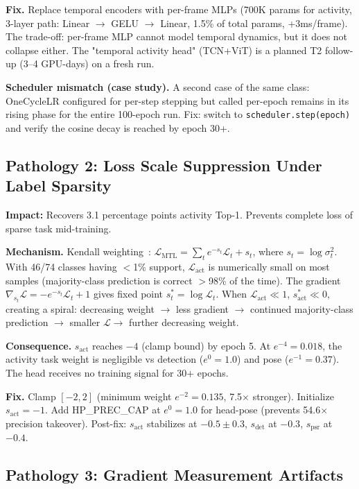 \documentclass[conference]{IEEEtran}
\begin{document}
\textbf{Fix.} Replace temporal encoders with per-frame MLPs (700K params for activity, 3-layer path: Linear $\to$ GELU $\to$ Linear, 1.5\% of total params, +3ms/frame). The trade-off: per-frame MLP cannot model temporal dynamics, but it does not collapse either. The "temporal activity head" (TCN+ViT) is a planned T2 follow-up (3--4 GPU-days) on a fresh run.

\textbf{Scheduler mismatch (case study).} A second case of the same class: OneCycleLR configured for per-step stepping but called per-epoch remains in its rising phase for the entire 100-epoch run. Fix: switch to \texttt{scheduler.step(epoch)} and verify the cosine decay is reached by epoch 30+.

\subsection{Pathology 2: Loss Scale Suppression Under Label Sparsity}
\label{sec:path2}

\textbf{Impact:} Recovers 3.1 percentage points activity Top-1. Prevents complete loss of sparse task mid-training.

\textbf{Mechanism.} Kendall weighting~\cite{kendall2018multi}: $\mathcal{L}_{\text{MTL}} = \sum_t e^{-s_t}\mathcal{L}_t + s_t$, where $s_t = \log\sigma^2_t$. With 46/74 classes having $<$1\% support, $\mathcal{L}_{\text{act}}$ is numerically small on most samples (majority-class prediction is correct $>$98\% of the time). The gradient $\nabla_{s_t}\mathcal{L} = -e^{-s_t}\mathcal{L}_t + 1$ gives fixed point $s_t^* = \log\mathcal{L}_t$. When $\mathcal{L}_{\text{act}} \ll 1$, $s_{\text{act}}^* \ll 0$, creating a spiral: decreasing weight $\to$ less gradient $\to$ continued majority-class prediction $\to$ smaller $\mathcal{L} \to$ further decreasing weight.

\textbf{Consequence.} $s_{\text{act}}$ reaches $-4$ (clamp bound) by epoch 5. At $e^{-4}=0.018$, the activity task weight is negligible vs detection ($e^{0}=1.0$) and pose ($e^{-1}=0.37$). The head receives no training signal for 30+ epochs.

\textbf{Fix.} Clamp $[-2,2]$ (minimum weight $e^{-2}=0.135$, 7.5$\times$ stronger). Initialize $s_{\text{act}}=-1$. Add HP\_PREC\_CAP at $e^{0}=1.0$ for head-pose (prevents 54.6$\times$ precision takeover). Post-fix: $s_{\text{act}}$ stabilizes at $-0.5 \pm 0.3$, $s_{\text{det}}$ at $-0.3$, $s_{\text{psr}}$ at $-0.4$.

\subsection{Pathology 3: Gradient Measurement Artifacts}
\label{sec:path3}
\end{document}
